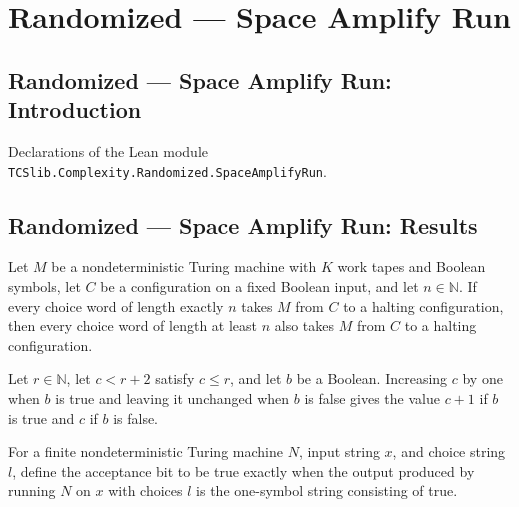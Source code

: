 \section{Randomized --- Space Amplify Run}
\subsection*{Randomized --- Space Amplify Run: Introduction}

Declarations of the Lean module \texttt{TCSlib.Complexity.Randomized.SpaceAmplifyRun}.

\subsection*{Randomized --- Space Amplify Run: Results}

\begin{theorem}
\label{Randomized.Amplify.halted_of_le}
\leanok
{}
Let $M$ be a nondeterministic Turing machine with $K$ work tapes and Boolean symbols,
let $C$ be a configuration on a fixed Boolean input, and let $n\in\mathbb{N}$. If every
choice word of length exactly $n$ takes $M$ from $C$ to a halting configuration, then
every choice word of length at least $n$ also takes $M$ from $C$ to a halting
configuration.
\end{theorem}

\begin{theorem}
\label{Randomized.Amplify.bump_val}
\leanok
{}
Let $r\in\mathbb{N}$, let $c<r+2$ satisfy $c\le r$, and let $b$ be a Boolean. Increasing
$c$ by one when $b$ is true and leaving it unchanged when $b$ is false gives the value
$c+1$ if $b$ is true and $c$ if $b$ is false.
\end{theorem}

\begin{definition}
\label{Randomized.Amplify.acc}
\leanok
{}
For a finite nondeterministic Turing machine $N$, input string $x$, and choice string
$l$, define the acceptance bit to be true exactly when the output produced by running
$N$ on $x$ with choices $l$ is the one-symbol string consisting of true.
\end{definition}

